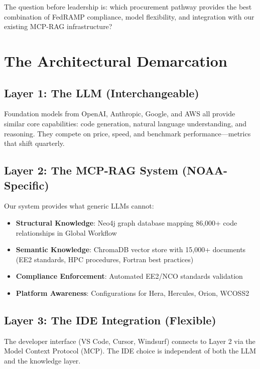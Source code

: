 \documentclass[11pt]{article}
\begin{document}
The question before leadership is: which procurement pathway provides the best combination of FedRAMP compliance, model flexibility, and integration with our existing MCP-RAG infrastructure?

\section*{The Architectural Demarcation}

\begin{center}
\end{center}

\subsection*{Layer 1: The LLM (Interchangeable)}
Foundation models from OpenAI, Anthropic, Google, and AWS all provide similar core capabilities: code generation, natural language understanding, and reasoning. They compete on price, speed, and benchmark performance---metrics that shift quarterly.

\subsection*{Layer 2: The MCP-RAG System (NOAA-Specific)}
Our system provides what generic LLMs cannot:
\begin{itemize}[itemsep=2pt]
    \item \textbf{Structural Knowledge}: Neo4j graph database mapping 86,000+ code relationships in Global Workflow
    \item \textbf{Semantic Knowledge}: ChromaDB vector store with 15,000+ documents (EE2 standards, HPC procedures, Fortran best practices)
    \item \textbf{Compliance Enforcement}: Automated EE2/NCO standards validation
    \item \textbf{Platform Awareness}: Configurations for Hera, Hercules, Orion, WCOSS2
\end{itemize}

\subsection*{Layer 3: The IDE Integration (Flexible)}
The developer interface (VS Code, Cursor, Windsurf) connects to Layer 2 via the Model Context Protocol (MCP). The IDE choice is independent of both the LLM and the knowledge layer.
\end{document}
